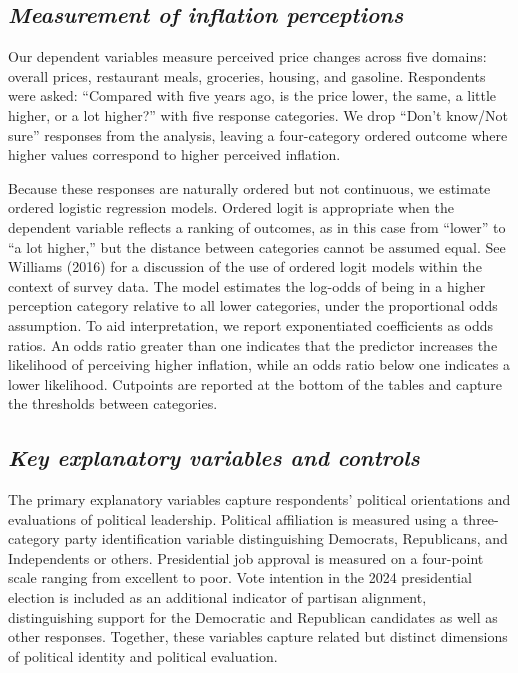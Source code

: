 \documentclass[]{interact}
\theoremstyle{plain}%
\theoremstyle{definition}
\theoremstyle{remark}
\begin{document}
\subsection*{\textit{Measurement of inflation perceptions}}


Our dependent variables measure perceived price changes across five domains: overall prices, restaurant meals, groceries, housing, and gasoline. Respondents were asked: “Compared with five years ago, is the price lower, the same, a little higher, or a lot higher?” with five response categories. We drop “Don’t know/Not sure” responses from the analysis, leaving a four-category ordered outcome where higher values correspond to higher perceived inflation.

Because these responses are naturally ordered but not continuous, we estimate ordered logistic regression models. Ordered logit is appropriate when the dependent variable reflects a ranking of outcomes, as in this case from “lower” to “a lot higher,” but the distance between categories cannot be assumed equal. See Williams (2016) for a discussion of the use of ordered logit models within the context of survey data.  The model estimates the log-odds of being in a higher perception category relative to all lower categories, under the proportional odds assumption. To aid interpretation, we report exponentiated coefficients as odds ratios. An odds ratio greater than one indicates that the predictor increases the likelihood of perceiving higher inflation, while an odds ratio below one indicates a lower likelihood. Cutpoints are reported at the bottom of the tables and capture the thresholds between categories.

\subsection*{\textit{Key explanatory variables and controls}}

The primary explanatory variables capture respondents’ political orientations and evaluations of political leadership. Political affiliation is measured using a three-category party identification variable distinguishing Democrats, Republicans, and Independents or others. Presidential job approval is measured on a four-point scale ranging from excellent to poor. Vote intention in the 2024 presidential election is included as an additional indicator of partisan alignment, distinguishing support for the Democratic and Republican candidates as well as other responses. Together, these variables capture related but distinct dimensions of political identity and political evaluation.
\end{document}
